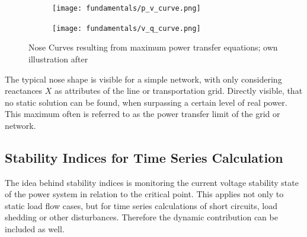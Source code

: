 \begin{figure}[htbp!]
    \centering
    \begin{subfigure}[b]{.49\linewidth}
        \texttt{[image: fundamentals/p\_v\_curve.png]}
    \end{subfigure}
    \begin{subfigure}[b]{.49\linewidth}
        \texttt{[image: fundamentals/v\_q\_curve.png]}
    \end{subfigure}
    \caption[Nose Curves resulting from maximum power transfer equations]{Nose Curves resulting from maximum power transfer equations; own illustration after \autocite{machowski_2020,kundur_2022,cutsem_1998}}
    \label{fig:v-stability-system}
\end{figure}

The typical nose shape is visible for a simple network, with only considering reactances $X$ as attributes of the line or transportation grid.
Directly visible, that no static solution can be found, when surpassing a certain level of real power. 
This maximum often is referred to as the power transfer limit of the grid or network.




\subsection{Stability Indices for Time Series Calculation}
\label{sec:stability-indices}

The idea behind stability indices is monitoring the current voltage stability state of the power system in relation to the critical point.
This applies not only to static load flow cases, but for time series calculations of short circuits, load shedding or other disturbances.
Therefore the dynamic contribution can be included as well. \quelle

